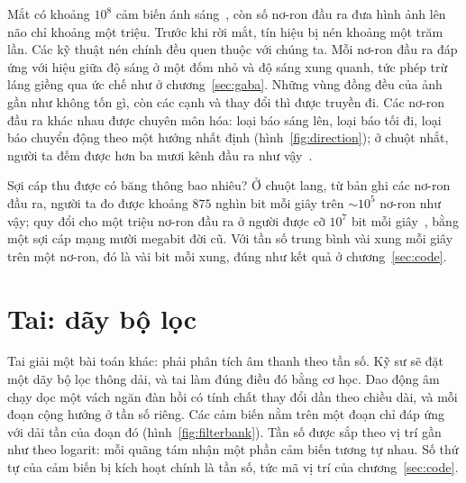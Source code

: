Mắt có khoảng $10^8$ cảm biến ánh sáng~\cite{Curcio1990}, còn số nơ-ron đầu ra đưa hình ảnh lên não chỉ khoảng một triệu. Trước khi rời mắt, tín hiệu bị nén khoảng một trăm lần. Các kỹ thuật nén chính đều quen thuộc với chúng ta. Mỗi nơ-ron đầu ra đáp ứng với hiệu giữa độ sáng ở một đốm nhỏ và độ sáng xung quanh, tức phép trừ láng giềng qua ức chế như ở chương~\ref{sec:gaba}. Những vùng đồng đều của ảnh gần như không tốn gì, còn các cạnh và thay đổi thì được truyền đi. Các nơ-ron đầu ra khác nhau được chuyên môn hóa: loại báo sáng lên, loại báo tối đi, loại báo chuyển động theo một hướng nhất định (hình~\ref{fig:direction}); ở chuột nhắt, người ta đếm được hơn ba mươi kênh đầu ra như vậy~\cite{Baden2016}.

Sợi cáp thu được có băng thông bao nhiêu? Ở chuột lang, từ bản ghi các nơ-ron đầu ra, người ta đo được khoảng $875$ nghìn bit mỗi giây trên $\sim10^5$ nơ-ron như vậy; quy đổi cho một triệu nơ-ron đầu ra ở người được cỡ $10^7$ bit mỗi giây~\cite{Koch2006}, bằng một sợi cáp mạng mười megabit đời cũ. Với tần số trung bình vài xung mỗi giây trên một nơ-ron, đó là vài bit mỗi xung, đúng như kết quả ở chương~\ref{sec:code}.

\section{Tai: dãy bộ lọc}

Tai giải một bài toán khác: phải phân tích âm thanh theo tần số. Kỹ sư sẽ đặt một dãy bộ lọc thông dải, và tai làm đúng điều đó bằng cơ học. Dao động âm chạy dọc một vách ngăn đàn hồi có tính chất thay đổi dần theo chiều dài, và mỗi đoạn cộng hưởng ở tần số riêng. Các cảm biến nằm trên một đoạn chỉ đáp ứng với dải tần của đoạn đó (hình~\ref{fig:filterbank}). Tần số được sắp theo vị trí gần như theo logarit: mỗi quãng tám nhận một phần cảm biến tương tự nhau. Số thứ tự của cảm biến bị kích hoạt chính là tần số, tức mã vị trí của chương~\ref{sec:code}.

